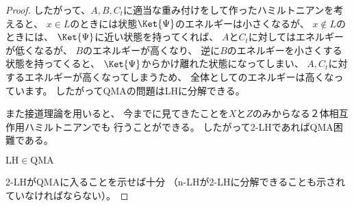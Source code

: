 \documentclass[a4paper, 10pt]{jsarticle}
\begin{document}
\begin{proof}
	したがって、$A, B, C_t$に適当な重み付けをして作ったハミルトニアンを考えると、
	$x \in L$のときには状態$\Ket{\Psi}$のエネルギーは小さくなるが、
	$x \notin L$のときには、
	$\Ket{\Psi}$に近い状態を持ってくれば、
	$A$と$C_t$に対してはエネルギーが低くなるが、
	$B$のエネルギーが高くなり、
	逆に$B$のエネルギーを小さくする状態を持ってくると、
	$\Ket{\Psi}$からかけ離れた状態になってしまい、
	$A, C_t$に対するエネルギーが高くなってしまうため、
	全体としてのエネルギーは高くなっています。
	したがってQMAの問題はLHに分解できる。

	また接道理論を用いると、
	今までに見てきたことを$X$と$Z$のみからなる２体相互作用ハミルトニアンでも
	行うことができる。
	したがって2-LHであればQMA困難である。

	\noindent
	\underline{$\mathrm{LH} \in \mathrm{QMA}$}

	2-LHがQMAに入ることを示せば十分
	（n-LHが2-LHに分解できることも示されていなければならない）。


\end{proof}
\end{document}
